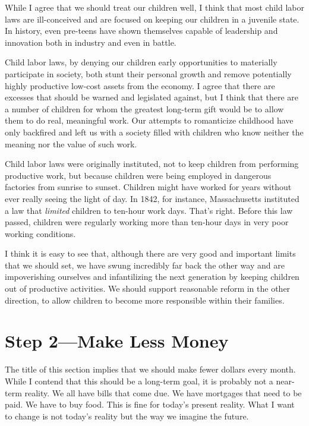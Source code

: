 \begin{policynote}
While I agree that we should treat our children well, I think that most
child labor laws are ill-conceived and are focused on keeping our
children in a juvenile state. In history, even pre-teens have shown
themselves capable of leadership and innovation both in industry and
even in battle. 

Child labor laws, by denying our children early opportunities to
materially participate in society, both stunt their personal growth and
remove potentially highly productive low-cost assets from the economy.
I agree that there are excesses that should be warned and legislated against, but I
think that there are a number of children for whom the greatest
long-term gift would be to allow them to do real, meaningful work. Our
attempts to romanticize childhood have only backfired and left us with
a society filled with children who know neither the meaning nor the
value of such work.

Child labor laws were originally instituted, not to keep children from
performing productive work, but because children were being employed in
dangerous factories from sunrise to sunset. Children might
have worked for years
without ever really seeing the light of day. In 1842, for instance,
Massachusetts instituted a law that \textit{limited} children to
ten-hour work days. That’s right. Before this law passed, children were
regularly working more than ten-hour days in very poor working
conditions.

I think it is easy to see that, although there are very good and
important limits that we should set, we have swung incredibly far back
the other way and are impoverishing ourselves and infantilizing
the next generation by keeping children out of productive activities. We should
support reasonable reform in the other direction, to allow children to
become more responsible within their families. 
\end{policynote}

\section{Step 2---Make Less Money}

The title of this section implies that we should make fewer dollars
every month. While I contend that this should be a long-term goal, it
is probably not a near-term reality. We all have bills that come due.
We have mortgages that need to be paid. We have to buy food. This is
fine for today’s present reality. What I want to change is not
today’s reality but the way we imagine the future.

